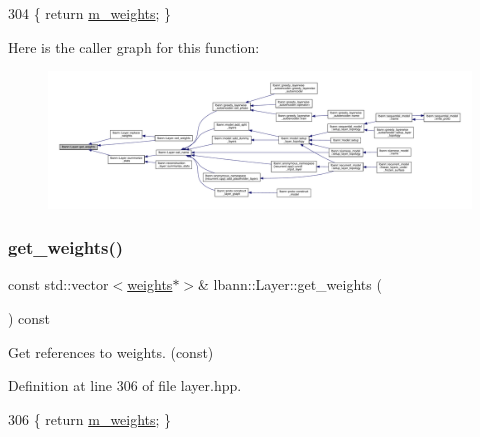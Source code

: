 \begin{DoxyCode}
304 \{ \textcolor{keywordflow}{return} \hyperlink{classlbann_1_1Layer_a7954e30fbf9100a6ba4b56d02767a469}{m\_weights}; \}
\end{DoxyCode}
Here is the caller graph for this function\+:\nopagebreak
\begin{figure}[H]
\begin{center}
\leavevmode
\includegraphics[width=350pt]{classlbann_1_1Layer_a4ee78d42284421519dd18d27b4da0957_icgraph}
\end{center}
\end{figure}
\mbox{\label{classlbann_1_1Layer_ab9fe05ad8d21ba5d6dd4d22ee2e0dca0}} 
\subsubsection{\texorpdfstring{get\+\_\+weights()}{get\_weights()}\hspace{0.1cm}{\footnotesize\ttfamily [2/2]}}
{\footnotesize\ttfamily const std\+::vector$<$\hyperlink{classlbann_1_1weights}{weights}$\ast$$>$\& lbann\+::\+Layer\+::get\+\_\+weights (\begin{DoxyParamCaption}{ }\end{DoxyParamCaption}) const\hspace{0.3cm}{\ttfamily [inline]}}

Get references to weights. (const) 

Definition at line 306 of file layer.\+hpp.


\begin{DoxyCode}
306 \{ \textcolor{keywordflow}{return} \hyperlink{classlbann_1_1Layer_a7954e30fbf9100a6ba4b56d02767a469}{m\_weights}; \}
\end{DoxyCode}
\mbox{\label{classlbann_1_1Layer_a2d50e9af2a9aa7e6741deb555641c30c}} 
